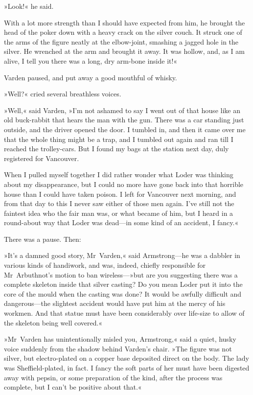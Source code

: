»Look!« he said.

With a lot more strength than I should have expected from him, he brought the head of the poker down with a heavy crack on the silver couch. It struck one of the arms of the figure neatly at the elbow-joint, smashing a jagged hole in the silver. He wrenched at the arm and brought it away. It was hollow, and, as I am alive, I tell you there was a long, dry arm-bone inside it!«

Varden paused, and put away a good mouthful of whisky.

»Well?« cried several breathless voices.

»Well,« said Varden, »I'm not ashamed to say I went out of that house like an old buck-rabbit that hears the man with the gun. There was a car standing just outside, and the driver opened the door. I tumbled in, and then it came over me that the whole thing might be a trap, and I tumbled out again and ran till I reached the trolley-cars. But I found my bags at the station next day, duly registered for Vancouver.

When I pulled myself together I did rather wonder what Loder was thinking about my disappearance, but I could no more have gone back into that horrible house than I could have taken poison. I left for Vancouver next morning, and from that day to this I never saw either of those men again. I've still not the faintest idea who the fair man was, or what became of him, but I heard in a round-about way that Loder was dead—in some kind of an accident, I fancy.«

There was a pause. Then:

»It's a damned good story, Mr~Varden,« said Armstrong—he was a dabbler in various kinds of handiwork, and was, indeed, chiefly responsible for Mr~Arbuthnot's motion to ban wireless—»but are you suggesting there was a complete skeleton inside that silver casting? Do you mean Loder put it into the core of the mould when the casting was done? It would be awfully difficult and dangerous—the slightest accident would have put him at the mercy of his workmen. And that statue must have been considerably over life-size to allow of the skeleton being well covered.«

»Mr~Varden has unintentionally misled you, Armstrong,« said a quiet, husky voice suddenly from the shadow behind Varden's chair. »The figure was not silver, but electro-plated on a copper base deposited direct on the body. The lady was Sheffield-plated, in fact. I fancy the soft parts of her must have been digested away with pepsin, or some preparation of the kind, after the process was complete, but I can't be positive about that.«

